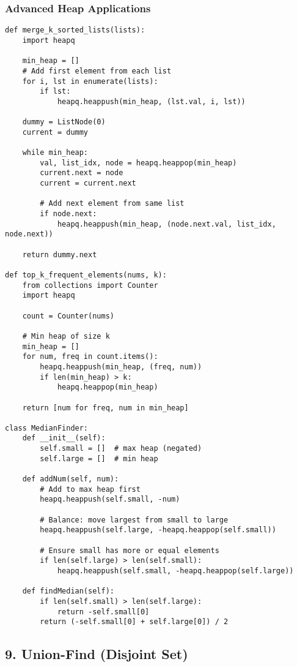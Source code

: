 \documentclass[10pt,a4paper]{article}
\begin{document}
\subsubsection{Advanced Heap Applications}
\begin{lstlisting}
def merge_k_sorted_lists(lists):
    import heapq

    min_heap = []
    # Add first element from each list
    for i, lst in enumerate(lists):
        if lst:
            heapq.heappush(min_heap, (lst.val, i, lst))

    dummy = ListNode(0)
    current = dummy

    while min_heap:
        val, list_idx, node = heapq.heappop(min_heap)
        current.next = node
        current = current.next

        # Add next element from same list
        if node.next:
            heapq.heappush(min_heap, (node.next.val, list_idx, node.next))

    return dummy.next

def top_k_frequent_elements(nums, k):
    from collections import Counter
    import heapq

    count = Counter(nums)

    # Min heap of size k
    min_heap = []
    for num, freq in count.items():
        heapq.heappush(min_heap, (freq, num))
        if len(min_heap) > k:
            heapq.heappop(min_heap)

    return [num for freq, num in min_heap]

class MedianFinder:
    def __init__(self):
        self.small = []  # max heap (negated)
        self.large = []  # min heap

    def addNum(self, num):
        # Add to max heap first
        heapq.heappush(self.small, -num)

        # Balance: move largest from small to large
        heapq.heappush(self.large, -heapq.heappop(self.small))

        # Ensure small has more or equal elements
        if len(self.large) > len(self.small):
            heapq.heappush(self.small, -heapq.heappop(self.large))

    def findMedian(self):
        if len(self.small) > len(self.large):
            return -self.small[0]
        return (-self.small[0] + self.large[0]) / 2
\end{lstlisting}

\subsection{9. Union-Find (Disjoint Set)}
\end{document}
